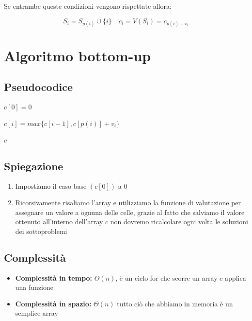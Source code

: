 Se entrambe queste condizioni vengono rispettate allora:

{
    \large

    $$
        S_i = S_{p(i)} \cup \{i\} \quad c_i = V(S_i) = c_{p(i) + v_i}
    $$
}

\section{Algoritmo bottom-up}
\subsection{Pseudocodice}
\begin{algorithm}
    \caption{WIS-WEIGHT}
    \begin{algorithmic}
            \State $c[0]=0$
            
                \State $c[i]=max\{c[i-1],c[p(i)] + v_i\}$
            \EndFor

            \State \Return $c$
            
        \EndProcedure
    \end{algorithmic}
\end{algorithm}
\subsection{Spiegazione}
\begin{enumerate}
    \item Impostiamo il caso base $(c[0])$ a 0
    \item Ricorsivamente risaliamo l'array e utilizziamo la funzione di valutazione per assegnare un valore a ognuna delle celle, grazie al fatto che salviamo il valore ottenuto all'interno dell'array $c$ non dovremo ricalcolare ogni volta le soluzioni dei sottoproblemi
\end{enumerate}

\subsection{Complessità}
\begin{itemize}
    \item \textbf{Complessità in tempo:} $\Theta(n)$, è un ciclo for che scorre un array e applica una funzione
    \item \textbf{Complessità in spazio:} $\Theta(n)$ tutto ciò che abbiamo in memoria è un semplice array
\end{itemize}

